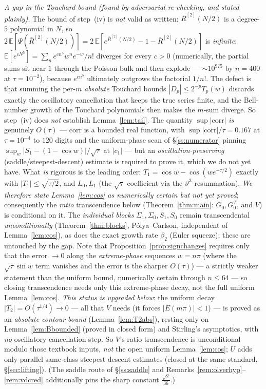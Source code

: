 \emph{A gap in the Touchard bound \textup(found by adversarial re-checking, and stated plainly\textup).}
The bound of step~(iv) is \emph{not} valid as written: $\bar R^{[2]}(N/2)$ is a degree-$5$ polynomial in
$N$, so $2\,\mathbb E[\Psi(\bar R^{[2]}(N/2))]=2\,\mathbb E[e^{\bar R^{[2]}(N/2)}-1-\bar R^{[2]}(N/2)]$
is \emph{infinite}: $\mathbb E[e^{c N^{5}}]=\sum_n e^{cn^{5}}w^{n}e^{-w}/n!$ diverges for every $c>0$
\textup(numerically, the partial sums sit near $1$ through the Poisson bulk and then explode --- $\sim
10^{975}$ by $n=400$ at $\tau=10^{-2}$\textup), because $e^{cn^{5}}$ ultimately outgrows the factorial
$1/n!$. The defect is that summing the per-$m$ \emph{absolute} Touchard bounds $|D_p|\le2^{-p}T_p(w)$
discards exactly the oscillatory cancellation that keeps the true series finite, and the Bell-number
growth of the Touchard polynomials then makes the $m$-sum diverge. So step~(iv) does \emph{not}
establish Lemma~\ref{lem:tail}. The quantity $\sup|\mathrm{corr}|$ \emph{is} genuinely $O(\tau)$ ---
$\mathrm{corr}$ is a bounded real function, with $\sup|\mathrm{corr}|/\tau=0.167$ at $\tau=10^{-4}$
to $120$ digits and the uniform-phase scan of \S\ref{ss:numerator} pinning $\sup_w|S_1-(1-\cos w)|/
\sqrt\tau$ at $|c_1|$ --- but an \emph{oscillation-preserving} \textup(saddle/steepest-descent\textup)
estimate is required to prove it, which we do not yet have. What \emph{is} rigorous is the leading order:
$T_1=\cos w-\cos(we^{-\tau/2})$ exactly with $|T_1|\le\sqrt{\tau/2}$, and $L_0,L_1$ \textup(the $\sqrt\tau$
coefficient via the $\vartheta^{3}$-resummation\textup). \emph{We therefore state Lemma~\ref{lem:cos}
as numerically certain but not yet proved}; consequently the \emph{ratio} transcendence below
\textup(Theorem~\ref{thm:main}: $G_0,G^{T}_0$, and $V$\textup) is conditional on it. The
\emph{individual blocks} $\Sigma_1,\Sigma_0,S_1,S_0$ remain transcendental \emph{unconditionally}
\textup(Theorem~\ref{thm:blocks}, P\'olya--Carlson, independent of Lemma~\ref{lem:cos}\textup), as
does the exact growth rate $\beta_2$ \textup(Euler squeeze\textup); these are untouched by the gap.
Note that Proposition~\ref{prop:signchanges} requires only that the error $\to0$ along the
\emph{extreme-phase} sequences $w=n\pi$ \textup(where the $\sqrt\tau\sin w$ term vanishes and the error
is the sharper $O(\tau)$\textup) --- a strictly weaker statement than the uniform bound, numerically
certain through $n\le64$ --- so closing transcendence needs only this extreme-phase decay, not the
full uniform Lemma~\ref{lem:cos}. \emph{This status is upgraded below}: the uniform decay $|T_2|=O(\tau^{1/4})\to0$ ---
all that $V$ needs (it forces $|E(m\pi)|<1$) --- is proved as an \emph{absolute contour bound}
(Lemma~\ref{lem:T2abs}), resting only on Lemma~\ref{lem:Bbounded} \textup(proved in closed form\textup) and
Stirling's asymptotics, with \emph{no} oscillatory-cancellation step. So $V$'s ratio transcendence
is unconditional modulo those textbook inputs, \emph{not} the open uniform Lemma~\ref{lem:cos}; $U$ adds only
parallel same-class steepest-descent estimates (closed at the same standard, \S\ref{sec:lifting}). \textup(The saddle route of \S\ref{ss:saddle} and
Remarks~\ref{rem:olverhyp}--\ref{rem:vdcred} additionally pins the sharp constant $\tfrac{\sqrt2}{36}$.\textup)

